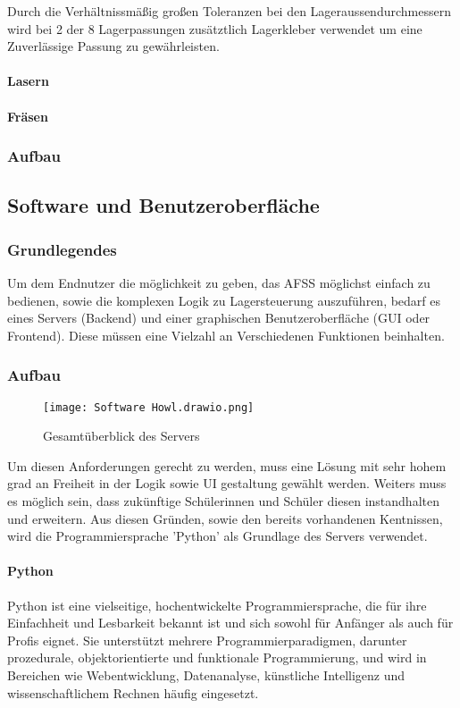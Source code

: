     Durch die Verhältnissmäßig großen Toleranzen bei den Lageraussendurchmessern wird bei 2 der 8 Lagerpassungen zusätztlich Lagerkleber verwendet um eine Zuverlässige Passung zu gewährleisten.


\paragraph{Lasern}
\paragraph{Fräsen}

\subsubsection{Aufbau}

\subsection{Software und Benutzeroberfläche}

\subsubsection{Grundlegendes}

Um dem Endnutzer die möglichkeit zu geben, das AFSS möglichst einfach zu bedienen, sowie die komplexen Logik zu Lagersteuerung auszuführen, bedarf es eines Servers (Backend) und einer graphischen Benutzeroberfläche (GUI oder Frontend). Diese müssen eine Vielzahl an Verschiedenen Funktionen beinhalten.

\subsubsection{Aufbau}
\begin{figure}[h]
    \texttt{[image: Software Howl.drawio.png]}
    \caption{Gesamtüberblick des Servers}
\end{figure}

Um diesen Anforderungen gerecht zu werden, muss eine Lösung mit sehr hohem grad an Freiheit in der Logik sowie UI gestaltung gewählt werden. Weiters muss es möglich sein, dass zukünftige Schülerinnen und Schüler diesen instandhalten und erweitern. Aus diesen Gründen, sowie den bereits vorhandenen Kentnissen, wird die Programmiersprache 'Python' als Grundlage des Servers verwendet.

\paragraph{Python}
Python ist eine vielseitige, hochentwickelte Programmiersprache, die für ihre Einfachheit und Lesbarkeit bekannt ist und sich sowohl für Anfänger als auch für Profis eignet. Sie unterstützt mehrere Programmierparadigmen, darunter prozedurale, objektorientierte und funktionale Programmierung, und wird in Bereichen wie Webentwicklung, Datenanalyse, künstliche Intelligenz und wissenschaftlichem Rechnen häufig eingesetzt. \cite{python_wp}

